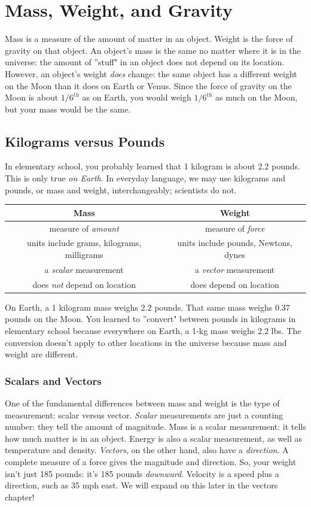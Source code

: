 \chapter{Mass, Weight, and Gravity}
Mass is a measure of the amount of matter in an object. Weight is the force of gravity on that object. An object's mass is the same no matter where it is in the universe: the amount of ''stuff" in an object does not depend on its location. However, an object's weight \textit{does} change: the same object has a different weight on the Moon than it does on Earth or Venus. Since the force of gravity on the Moon is about $1/6^{th}$ as on Earth, you would weigh $1/6^{th}$ as much on the Moon, but your mass would be the same. 

\section{Kilograms versus Pounds}
In elementary school, you probably learned that 1 kilogram is about 2.2 pounds. This is only true \textit{on Earth}. In everyday language, we may use kilograms and pounds, or mass and weight, interchangeably; scientists do not. 

\begin{tabular}{|c|c|}\hline
\textbf{Mass} & \textbf{Weight}\\\hline
measure of \textit{amount} & measure of \textit{force}\\\hline
units include grams, kilograms, milligrams & units include pounds, Newtons, dynes\\\hline
a \textit{scalar} measurement & a \textit{vector} measurement\\\hline
does \textit{not} depend on location & does depend on location\\\hline
\end{tabular}

On Earth, a 1 kilogram mass weighs 2.2 pounds. That same mass weighs 0.37 pounds on the Moon. You learned to ''convert" between pounds in kilograms in elementary school because everywhere on Earth, a 1-kg mass weighs 2.2 lbs. The conversion doesn't apply to other locations in the universe because mass and weight are different. 

\subsection{Scalars and Vectors}
One of the fundamental differences between mass and weight is the type of measurement: scalar versus vector. \textit{Scalar} measurements are just a counting number: they tell the amount of magnitude. Mass is a scalar measurement: it tells how much matter is in an object. Energy is also a scalar measurement, as well as temperature and density. \textit{Vectors}, on the other hand, also have a \textit{direction}. A complete measure of a force gives the magnitude and direction. So, your weight isn't just 185 pounds: it's 185 pounds \textit{downward}. Velocity is a speed plus a direction, such as 35 mph east. We will expand on this later in the vectors chapter!

